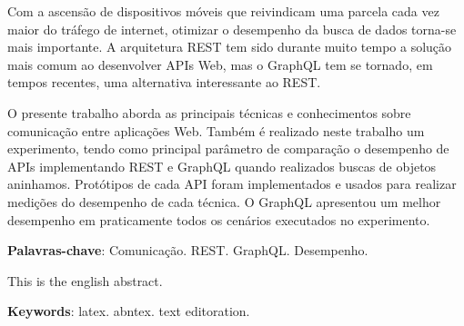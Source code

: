 \setlength{\absparsep}{18pt} %
\begin{resumo}

    Com a ascensão de dispositivos móveis que reivindicam uma parcela cada vez maior do tráfego de internet, otimizar o desempenho da busca de dados torna-se mais importante. A arquitetura REST tem sido durante muito tempo a solução mais comum ao desenvolver APIs Web, mas o GraphQL tem se tornado, em tempos recentes, uma alternativa interessante ao REST. 
    
    O presente trabalho aborda as principais técnicas e conhecimentos sobre comunicação entre aplicações Web. Também é realizado neste trabalho um experimento, tendo como principal parâmetro de comparação o desempenho de APIs implementando REST e GraphQL quando realizados buscas de objetos aninhamos. Protótipos de cada API foram implementados e usados para realizar medições do desempenho de cada técnica. O GraphQL apresentou um melhor desempenho em praticamente todos os cenários executados no experimento.

\textbf{Palavras-chave}: Comunicação. REST. GraphQL. Desempenho.

\end{resumo}

\begin{resumo}[Abstract]
 
   This is the english abstract.

   \vspace{\onelineskip}
 
   \noindent 
   \textbf{Keywords}: latex. abntex. text editoration.
 
\end{resumo}
